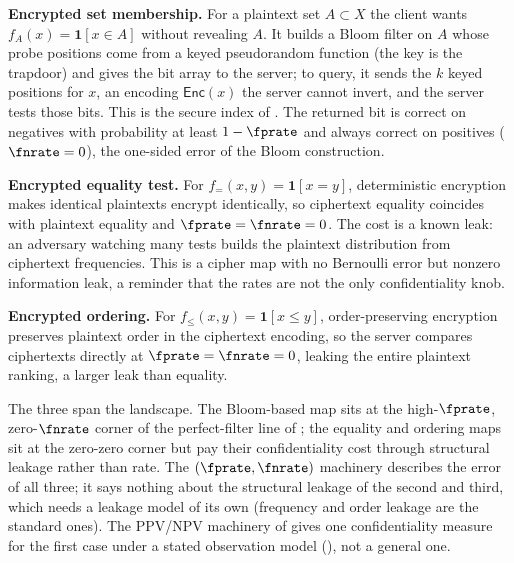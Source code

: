 \textbf{Encrypted set membership.} For a plaintext set $A \subset X$ the
client wants $f_A(x) = \mathbf{1}[x \in A]$ without revealing $A$. It
builds a Bloom filter on $A$ whose probe positions come from a keyed
pseudorandom function (the key is the trapdoor) and gives the bit array
to the server; to query, it sends the $k$ keyed positions for $x$, an
encoding $\mathsf{Enc}(x)$ the server cannot invert, and the server tests
those bits. This is the secure index of \textcite{goh-2003}. The
returned bit is correct on negatives with probability at least $1 -
\fprate$ and always correct on positives ($\fnrate = 0$), the one-sided
error of the Bloom construction.

\textbf{Encrypted equality test.} For $f_=(x, y) = \mathbf{1}[x = y]$,
deterministic encryption makes identical plaintexts encrypt identically,
so ciphertext equality coincides with plaintext equality and $\fprate =
\fnrate = 0$. The cost is a known leak: an adversary watching many tests
builds the plaintext distribution from ciphertext frequencies. This is a
cipher map with no Bernoulli error but nonzero information leak, a
reminder that the rates are not the only confidentiality knob.

\textbf{Encrypted ordering.} For $f_{\le}(x, y) = \mathbf{1}[x \le y]$,
order-preserving encryption preserves plaintext order in the ciphertext
encoding, so the server compares ciphertexts directly at $\fprate =
\fnrate = 0$, leaking the entire plaintext ranking, a larger leak than
equality.

The three span the landscape. The Bloom-based map sits at the
high-$\fprate$, zero-$\fnrate$ corner of the perfect-filter line of
; the equality and ordering maps sit at the
zero-zero corner but pay their confidentiality cost through structural
leakage rather than rate. The $(\fprate, \fnrate)$ machinery describes the error of all three; it
says nothing about the structural leakage of the second and third, which
needs a leakage model of its own (frequency and order leakage are the
standard ones). The PPV/NPV machinery of  gives one
confidentiality measure for the first case under a stated observation
model (), not a general one.

